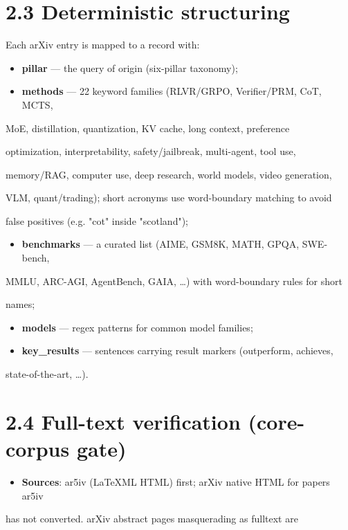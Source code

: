 \documentclass[11pt]{article}
\begin{document}
\section{2.3 Deterministic structuring}

Each arXiv entry is mapped to a record with:


\begin{itemize}
\item \textbf{pillar} --- the query of origin (six-pillar taxonomy);
\item \textbf{methods} --- 22 keyword families (RLVR/GRPO, Verifier/PRM, CoT, MCTS,
\end{itemize}
MoE, distillation, quantization, KV cache, long context, preference

optimization, interpretability, safety/jailbreak, multi-agent, tool use,

memory/RAG, computer use, deep research, world models, video generation,

VLM, quant/trading); short acronyms use word-boundary matching to avoid

false positives (e.g. "cot" inside "scotland");

\begin{itemize}
\item \textbf{benchmarks} --- a curated list (AIME, GSM8K, MATH, GPQA, SWE-bench,
\end{itemize}
MMLU, ARC-AGI, AgentBench, GAIA, \ldots) with word-boundary rules for short

names;

\begin{itemize}
\item \textbf{models} --- regex patterns for common model families;
\item \textbf{key\_results} --- sentences carrying result markers (outperform, achieves,
\end{itemize}
state-of-the-art, \ldots).


\section{2.4 Full-text verification (core-corpus gate)}

\begin{itemize}
\item \textbf{Sources}: ar5iv (LaTeXML HTML) first; arXiv native HTML for papers ar5iv
\end{itemize}
has not converted. arXiv abstract pages masquerading as fulltext are
\end{document}
